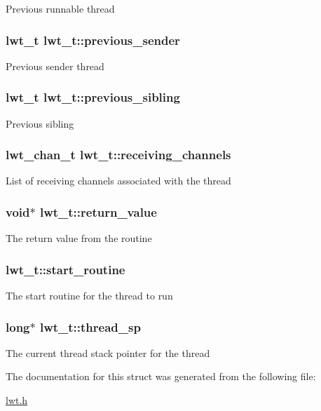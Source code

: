 Previous runnable thread \hypertarget{structlwt_ae9ef76c08e20117f01976c5c7cfb28b9}{
\subsubsection[{previous\+\_\+sender}]{\setlength{\rightskip}{0pt plus 5cm}lwt\+\_\+t lwt\+\_\+t\+::previous\+\_\+sender}}\label{structlwt_ae9ef76c08e20117f01976c5c7cfb28b9}
Previous sender thread \hypertarget{structlwt_a28f05f6ebc974d92415a55b8e190670e}{
\subsubsection[{previous\+\_\+sibling}]{\setlength{\rightskip}{0pt plus 5cm}lwt\+\_\+t lwt\+\_\+t\+::previous\+\_\+sibling}}\label{structlwt_a28f05f6ebc974d92415a55b8e190670e}
Previous sibling \hypertarget{structlwt_ac857ca0e804faec3a2dc17ff1ee0f22d}{
\subsubsection[{receiving\+\_\+channels}]{\setlength{\rightskip}{0pt plus 5cm}lwt\+\_\+chan\+\_\+t lwt\+\_\+t\+::receiving\+\_\+channels}}\label{structlwt_ac857ca0e804faec3a2dc17ff1ee0f22d}
List of receiving channels associated with the thread \hypertarget{structlwt_a22ac5beef8503481294035218e73c3ef}{
\subsubsection[{return\+\_\+value}]{\setlength{\rightskip}{0pt plus 5cm}void$\ast$ lwt\+\_\+t\+::return\+\_\+value}}\label{structlwt_a22ac5beef8503481294035218e73c3ef}
The return value from the routine \hypertarget{structlwt_acdcfc344e943154b9d3d11e1a41cb9f1}{
\subsubsection[{start\+\_\+routine}]{ lwt\+\_\+t\+::start\+\_\+routine}}\label{structlwt_acdcfc344e943154b9d3d11e1a41cb9f1}
The start routine for the thread to run \hypertarget{structlwt_aba48cdf2f962d7ededf74923ddd33ea1}{
\subsubsection[{thread\+\_\+sp}]{\setlength{\rightskip}{0pt plus 5cm}long$\ast$ lwt\+\_\+t\+::thread\+\_\+sp}}\label{structlwt_aba48cdf2f962d7ededf74923ddd33ea1}
The current thread stack pointer for the thread 

The documentation for this struct was generated from the following file\+:\begin{DoxyCompactItemize}
\item 
\hyperlink{lwt_8h}{lwt.\+h}\end{DoxyCompactItemize}
